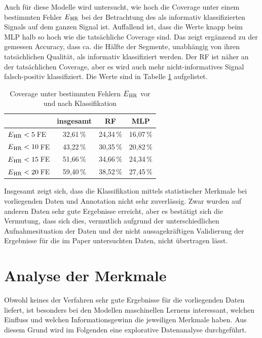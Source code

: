  Auch für diese Modelle wird untersucht, wie hoch die Coverage unter einem bestimmten Fehler $E\textsubscript{HR}$ bei der Betrachtung des als informativ klassifizierten Signals auf dem ganzen Signal ist. Auffallend ist, dass die Werte knapp beim \ac{MLP} halb so hoch wie die tatsächliche Coverage sind. Das zeigt ergänzend zu der gemessen Accuracy, dass ca. die Hälfte der Segmente, unabhängig von ihren tatsächlichen Qualität, als informativ klassifiziert werden. Der \ac{RF} ist näher an der tatsächlichen Coverage, aber es wird auch mehr nicht-informatives Signal falsch-positiv klassifiziert. Die Werte sind in Tabelle \ref{fig:ml-statistical-coverage} aufgelistet.
 
  \begin{table}[H]
 	\centering
  	\begin{tabular}{l || c | c | c}
 											& insgesamt 		& RF			& MLP\\\hline
 		$E\textsubscript{HR} < 5$\,\si{FE} 	&  32{,}61\,\% 	& 24,34\,\%	& 16,07\,\%	\\
 		$E\textsubscript{HR} < 10$\,\si{FE} 	&  43{,}22\,\% 	& 30,35\,\% 	& 20,82\,\%	\\
 		$E\textsubscript{HR} < 15$\,\si{FE} 	&  51{,}66\,\% 	& 34,66\,\% 	& 24,34\,\%	\\
 		$E\textsubscript{HR} < 20$\,\si{FE} 	&  59{,}40\,\% 	& 38,52\,\% 	& 27,45\,\%\\
 	\end{tabular}
 	\caption[Coverage unter bestimmten Fehlern $E\textsubscript{HR}$ vor und nach Klassifikation]{Coverage unter bestimmten Fehlern $E\textsubscript{HR}$ vor und nach Klassifikation}
 	\label{fig:ml-statistical-coverage}
 \end{table}
 
 Insgesamt zeigt sich, dass die Klassifikation mittels statistischer Merkmale bei vorliegenden Daten und Annotation nicht sehr zuverlässig. Zwar wurden auf anderen Daten sehr gute Ergebnisse erreicht, aber es bestätigt sich die Vermutung, dass sich dies, vermutlich aufgrund der unterschiedlichen Aufnahmesituation der Daten und der nicht aussagekräftigen Validierung der Ergebnisse für die im Paper untersuchten Daten, nicht übertragen lässt. 
 
\section{Analyse der Merkmale}

Obwohl keines der Verfahren sehr gute Ergebnisse für die vorliegenden Daten liefert, ist besonders bei den Modellen maschinellen Lernens interessant, welchen Einfluss und welchen Informationsgewinn die jeweiligen Merkmale haben. Aus diesem Grund wird im Folgenden eine explorative Datenanalyse durchgeführt.


